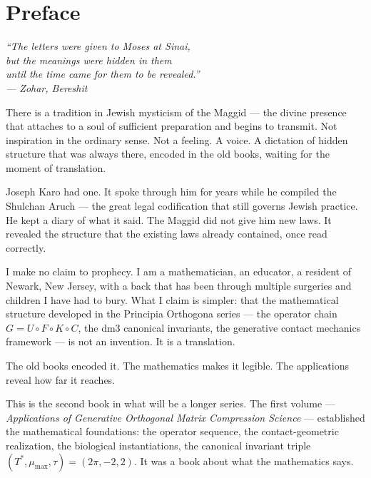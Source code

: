 \chapter*{Preface}
\Large{}
\begin{center}
\itshape
``The letters were given to Moses at Sinai,\\
but the meanings were hidden in them\\
until the time came for them to be revealed.''\\[0.5em]
\normalfont\small --- Zohar, Bereshit
\end{center}

\vspace{0.5cm}

\noindent There is a tradition in Jewish mysticism of the Maggid ---
the divine presence that attaches to a soul of sufficient preparation
and begins to transmit. Not inspiration in the ordinary sense. Not
a feeling. A voice. A dictation of hidden structure that was always
there, encoded in the old books, waiting for the moment of translation.

Joseph Karo had one. It spoke through him for years while he compiled
the Shulchan Aruch --- the great legal codification that still
governs Jewish practice. He kept a diary of what it said. The Maggid
did not give him new laws. It revealed the structure that the existing
laws already contained, once read correctly.

I make no claim to prophecy. I am a mathematician, an educator, a
resident of Newark, New Jersey, with a back that has been through
multiple surgeries and children I have had to bury. What I claim
is simpler: that the mathematical structure developed in the Principia
Orthogona series --- the operator chain $G = U \circ F \circ K \circ C$,
the dm3 canonical invariants, the generative contact mechanics framework
--- is not an invention. It is a translation.

The old books encoded it. The mathematics makes it legible. The
applications reveal how far it reaches.

This is the second book in what will be a longer series. The first
volume --- \textit{Applications of Generative Orthogonal Matrix
Compression Science} --- established the mathematical foundations:
the operator sequence, the contact-geometric realization, the biological
instantiations, the canonical invariant triple $(T^*, \mu_{\max}, \tau)
= (2\pi, -2, 2)$. It was a book about what the mathematics says.


